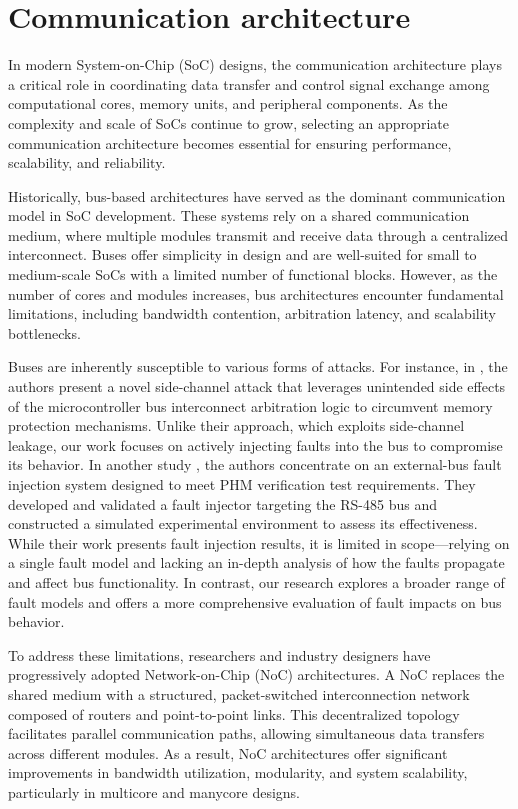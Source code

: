 \section{Communication architecture}
In modern System-on-Chip (SoC) designs, the communication architecture plays a critical role in coordinating data transfer and control signal exchange among computational cores, memory units, and peripheral components. As the complexity and scale of SoCs continue to grow, selecting an appropriate communication architecture becomes essential for ensuring performance, scalability, and reliability.

Historically, bus-based architectures have served as the dominant communication model in SoC development. These systems rely on a shared communication medium, where multiple modules transmit and receive data through a centralized interconnect. Buses offer simplicity in design and are well-suited for small to medium-scale SoCs with a limited number of functional blocks. However, as the number of cores and modules increases, bus architectures encounter fundamental limitations, including bandwidth contention, arbitration latency, and scalability bottlenecks.

Buses are inherently susceptible to various forms of attacks. For instance, in \cite{rodrigues2024busted}, the authors present a novel side-channel attack that leverages unintended side effects of the microcontroller bus interconnect arbitration logic to circumvent memory protection mechanisms. Unlike their approach, which exploits side-channel leakage, our work focuses on actively injecting faults into the bus to compromise its behavior. In another study \cite{5979407}, the authors concentrate on an external-bus fault injection system designed to meet PHM verification test requirements. They developed and validated a fault injector targeting the RS-485 bus and constructed a simulated experimental environment to assess its effectiveness. While their work presents fault injection results, it is limited in scope—relying on a single fault model and lacking an in-depth analysis of how the faults propagate and affect bus functionality. In contrast, our research explores a broader range of fault models and offers a more comprehensive evaluation of fault impacts on bus behavior.

To address these limitations, researchers and industry designers have progressively adopted Network-on-Chip (NoC) architectures. A NoC replaces the shared medium with a structured, packet-switched interconnection network composed of routers and point-to-point links. This decentralized topology facilitates parallel communication paths, allowing simultaneous data transfers across different modules. As a result, NoC architectures offer significant improvements in bandwidth utilization, modularity, and system scalability, particularly in multicore and manycore designs.

